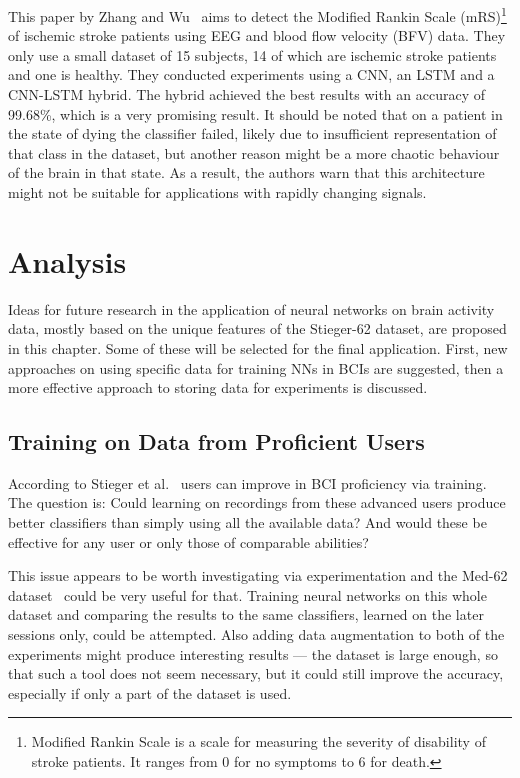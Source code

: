 \documentclass[english, he, bc, kiv, iso690alph, viewonly]{fasthesis}
\begin{document}
This paper by Zhang and Wu~\cite{zhang:similar:20} aims to detect the Modified Rankin Scale (mRS)\footnote{Modified Rankin Scale is a scale for measuring the severity of disability of stroke patients. It ranges from 0 for no symptoms to 6 for death.} of ischemic stroke patients using EEG and blood flow velocity (BFV) data. They only use a small dataset of 15 subjects, 14 of which are ischemic stroke patients and one is healthy. They conducted experiments using a CNN, an LSTM and a CNN-LSTM hybrid. The hybrid achieved the best results with an accuracy of 99.68\%, which is a very promising result. It should be noted that on a patient in the state of dying the classifier failed, likely due to insufficient representation of that class in the dataset, but another reason might be a more chaotic behaviour of the brain in that state. As a result, the authors warn that this architecture might not be suitable for applications with rapidly changing signals.

\chapter{Analysis}

Ideas for future research in the application of neural networks on brain activity data, mostly based on the unique features of the Stieger-62 dataset, are proposed in this chapter. Some of these will be selected for the final application. First, new approaches on using specific data for training NNs in BCIs are suggested, then a more effective approach to storing data for experiments is discussed.

\section{Training on Data from Proficient Users}

According to Stieger et al.~\cite{data:stieger:21,stieger:mindfulness:20} users can improve in BCI proficiency via training. The question is: Could learning on recordings from these advanced users produce better classifiers than simply using all the available data? And would these be effective for any user or only those of comparable abilities?

This issue appears to be worth investigating via experimentation and the Med-62 dataset~\cite{data:stieger:21} could be very useful for that. Training neural networks on this whole dataset and comparing the results to the same classifiers, learned on the later sessions only, could be  attempted. Also adding data augmentation to both of the experiments might produce interesting results --- the dataset is large enough, so that such a tool does not seem necessary, but it could still improve the accuracy, especially if only a part of the dataset is used.
\end{document}
